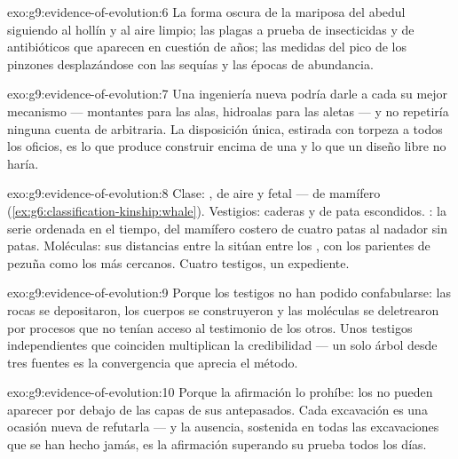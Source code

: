 \begin{solution}{exo:g9:evidence-of-evolution:6}
La forma oscura de la mariposa del abedul siguiendo al hollín y al aire
limpio; las plagas a prueba de insecticidas y de antibióticos que
aparecen en cuestión de años; las medidas del pico de los pinzones
desplazándose con las sequías y las épocas de abundancia.
\end{solution}

\begin{solution}{exo:g9:evidence-of-evolution:7}
Una ingeniería nueva podría darle a cada  su mejor mecanismo
--- montantes para las alas, hidroalas para las aletas --- y no
repetiría ninguna cuenta de  arbitraria. La disposición única,
estirada con torpeza a todos los oficios, es lo que produce construir
encima de una  y lo que un diseño libre no haría.
\end{solution}

\begin{solution}{exo:g9:evidence-of-evolution:8}
Clase: ,  de aire y  fetal ---  de
mamífero (\cref{ex:g6:classification-kinship:whale}). Vestigios:
caderas y  de pata escondidos. : la serie ordenada en el
tiempo, del mamífero costero de cuatro patas al nadador sin patas.
Moléculas: sus distancias entre  la sitúan entre los ,
con los parientes de pezuña como los más cercanos. Cuatro testigos, un
expediente.
\end{solution}

\begin{solution}{exo:g9:evidence-of-evolution:9}
Porque los testigos no han podido confabularse: las rocas se
depositaron, los cuerpos se construyeron y las moléculas se
deletrearon por procesos que no tenían acceso al testimonio de los
otros. Unos testigos independientes que coinciden multiplican la
credibilidad --- un solo árbol desde tres fuentes es la convergencia
que aprecia el método.
\end{solution}

\begin{solution}{exo:g9:evidence-of-evolution:10}
Porque la afirmación lo prohíbe: los  no pueden aparecer por
debajo de las capas de sus antepasados. Cada excavación es una ocasión
nueva de refutarla --- y la ausencia, sostenida en todas las
excavaciones que se han hecho jamás, es la afirmación superando su
prueba todos los días.
\end{solution}

